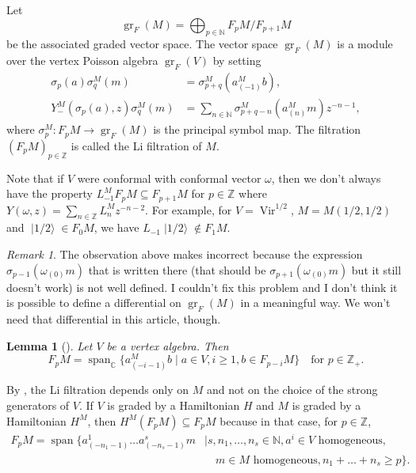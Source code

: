 \documentclass[a4paper, 12pt, reqno]{amsart}
\newtheorem{lemma}[theorem]{Lemma}
\theoremstyle{remark}
\newtheorem{remark}[theorem]{Remark}
\numberwithin{equation}{subsection}
\DeclareMathOperator{\Vir}{Vir}
\DeclareMathOperator{\gr}{gr}
\DeclareMathOperator{\vspan}{span}
\DeclareMathOperator{\vachalf}{|1/2\rangle}
\begin{document}
Let
\begin{equation*}
  \gr_F(M) = \bigoplus_{p \in \mathbb{N}}F_pM/F_{p + 1}M
\end{equation*}
be the associated graded vector space.
The vector space $\gr_F(M)$ is a module over the vertex Poisson algebra $\gr_F(V)$ by setting
\begin{align*}
  \sigma_p(a)\sigma^M_q(m) &= \sigma^M_{p + q}(a^M_{(-1)}b), \\
  Y^M_-(\sigma_p(a), z)\sigma^M_q(m) &= \sum_{n \in \mathbb{N}}\sigma^M_{p + q - n}(a^M_{(n)}m)z^{-n - 1},
\end{align*}
where $\sigma^M_p: F_pM \to \gr_F(M)$ is the principal symbol map.
The filtration $(F_pM)_{p \in \mathbb{Z}}$ is called the Li filtration of $M$.

Note that if $V$ were conformal with conformal vector $\omega$, then we don't always have the property $L_{-1}^MF_pM \subseteq F_{p + 1}M$ for $p \in \mathbb{Z}$ where $Y(\omega, z) = \sum_{n \in \mathbb{Z}}L^M_nz^{-n - 2}$.
For example, for $V = \Vir^{1/2}$, $M = M(1/2, 1/2)$ and $\vachalf \in F_0M$, we have $L_{-1}\vachalf \notin F_1M$.

\begin{remark}
  \label{rmk:32}
  The observation above makes \cite[Lemma 3.1.2]{arakawa_remark_2012} incorrect because the expression $\sigma_{p - 1}(\omega_{(0)}m)$ that is written there (that should be $\sigma_{p + 1}(\omega_{(0)}m)$ but it still doesn't work) is not well defined.
  I couldn't fix this problem and I don't think it is possible to define a differential on $\gr_F(M)$ in a meaningful way.
  We won't need that differential in this article, though.
\end{remark}

\begin{lemma}[{\cite[Lemma 2.9]{li_abelianizing_2005}}]
  \label{lmm:20}
  Let $V$ be a vertex algebra.
  Then
  \begin{equation*}
    F_pM = \vspan_{\mathbb{C}}\{a^M_{(-i - 1)}b \mid a \in V, i \ge 1, b \in F_{p - i}M\} \quad \text{for }p \in \mathbb{Z}_+.
  \end{equation*}
\end{lemma}

By , the Li filtration depends only on $M$ and not on the choice of the strong generators of $V$.
If $V$ is graded by a Hamiltonian $H$ and $M$ is graded by a Hamiltonian $H^M$, then $H^M(F_pM) \subseteq F_pM$ because in that case, for $p \in \mathbb{Z}$,
\begin{equation*}
  \begin{split}
    F_pM =\vspan \{a^1_{(-n_1 - 1)}\dots a^s_{(-n_s - 1)}m &\mid s, n_1, \dots, n_s \in \mathbb{N}, a^i \in V\text{ homogeneous},\\
    &\quad  m \in M\text{ homogeneous}, n_1 + \dots + n_s \ge p\}.
  \end{split}
\end{equation*}
\end{document}
